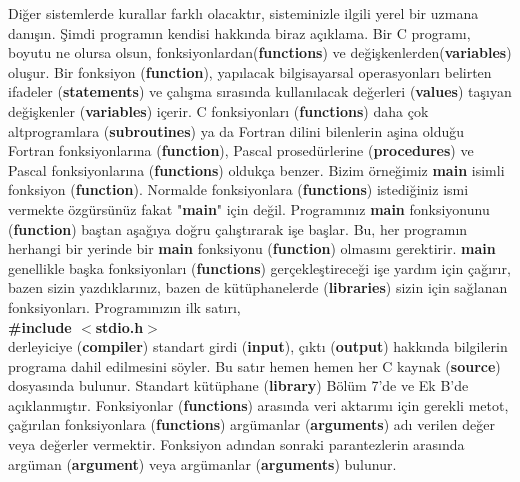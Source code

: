 \documentclass[a4paper,12pt,oneside]{book}
\begin{document}
Diğer sistemlerde kurallar farklı olacaktır, sisteminizle ilgili yerel bir uzmana danışın.
Şimdi programın kendisi hakkında biraz açıklama. Bir C programı, boyutu ne olursa olsun, fonksiyonlardan(\textbf{functions}) ve değişkenlerden(\textbf{variables}) oluşur. Bir fonksiyon (\textbf{function}), yapılacak bilgisayarsal operasyonları belirten ifadeler (\textbf{statements}) ve çalışma sırasında kullanılacak değerleri (\textbf{values}) taşıyan değişkenler (\textbf{variables}) içerir. C fonksiyonları (\textbf{functions}) daha çok altprogramlara (\textbf{subroutines}) ya da Fortran dilini bilenlerin aşina olduğu Fortran fonksiyonlarına (\textbf{function}), Pascal prosedürlerine (\textbf{procedures}) ve Pascal fonksiyonlarına (\textbf{functions}) oldukça benzer. Bizim örneğimiz \textbf{main} isimli fonksiyon (\textbf{function}). Normalde fonksiyonlara (\textbf{functions}) istediğiniz ismi vermekte özgürsünüz fakat "\textbf{main}" için değil. Programınız \textbf{main} fonksiyonunu (\textbf{function}) baştan aşağıya doğru çalıştırarak işe başlar. Bu, her programın herhangi bir yerinde bir \textbf{main} fonksiyonu (\textbf{function}) olmasını gerektirir.
\textbf{main} genellikle başka fonksiyonları (\textbf{functions}) gerçekleştireceği işe yardım için çağırır, bazen sizin yazdıklarınız, bazen de kütüphanelerde (\textbf{libraries}) sizin için sağlanan fonksiyonları. Programınızın ilk satırı, \\

\textbf{\#include $<$stdio.h$>$} \\

derleyiciye (\textbf{compiler}) standart girdi (\textbf{input}), çıktı (\textbf{output}) hakkında bilgilerin programa dahil edilmesini söyler. Bu satır hemen hemen her C kaynak (\textbf{source}) dosyasında bulunur. Standart kütüphane (\textbf{library}) Bölüm 7'de ve Ek B'de açıklanmıştır.
Fonksiyonlar (\textbf{functions}) arasında veri aktarımı için gerekli metot, çağırılan fonksiyonlara (\textbf{functions}) argümanlar (\textbf{arguments}) adı verilen değer veya değerler vermektir. Fonksiyon adından sonraki parantezlerin arasında argüman (\textbf{argument}) veya argümanlar (\textbf{arguments}) bulunur. \\
\end{document}
